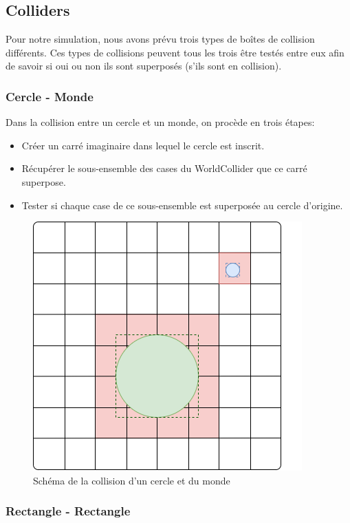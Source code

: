 \documentclass{EPUProjetDi}
\begin{document}
\subsection{Colliders}

Pour notre simulation, nous avons prévu trois types de boîtes de collision différents. Ces types de collisions
peuvent tous les trois être testés entre eux afin de savoir si oui ou non ils sont superposés (s'ils sont en collision).

\subsubsection*{Cercle - Monde}

Dans la collision entre un cercle et un monde, on procède en trois étapes:
\begin{itemize}
    \item Créer un carré imaginaire dans lequel le cercle est inscrit.
    \item Récupérer le sous-ensemble des cases du WorldCollider que ce carré superpose.
    \item Tester si chaque case de ce sous-ensemble est superposée au cercle d'origine.
\end{itemize}

\begin{figure}[h]
    \centering
    \includegraphics[scale=0.6]{world_collider_circle.png}
    \caption{Schéma de la collision d'un cercle et du monde}
    \label{fig:world_collider_circle}
\end{figure}

\pagebreak

\subsubsection*{Rectangle - Rectangle}
\end{document}
